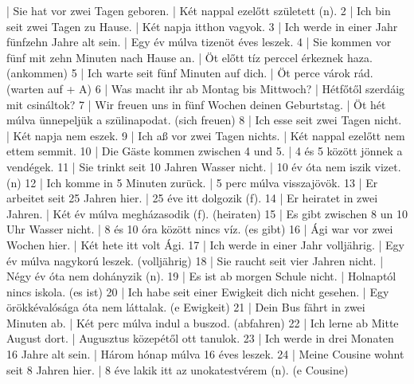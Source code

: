 \documentclass{article}
\newenvironment{exmp}{\verbatim}{\endverbatim}
\begin{document}
\begin{exmp}
1 | Sie hat vor zwei Tagen geboren. | Két nappal ezelőtt született (n).
2 | Ich bin seit zwei Tagen zu Hause. | Két napja itthon vagyok.
3 | Ich werde in einer Jahr fünfzehn Jahre alt sein. | Egy év múlva tizenöt éves leszek.
4 | Sie kommen vor fünf mit zehn Minuten nach Hause an. | Öt előtt tíz perccel érkeznek haza. (ankommen)
5 | Ich warte seit fünf Minuten auf dich. | Öt perce várok rád. (warten auf + A)
6 | Was macht ihr ab Montag bis Mittwoch? | Hétfőtől szerdáig mit csináltok?
7 | Wir freuen uns in fünf Wochen deinen Geburtstag. | Öt hét múlva ünnepeljük a szülinapodat. (sich freuen)
8 | Ich esse seit zwei Tagen nicht. | Két napja nem eszek.
9 | Ich aß vor zwei Tagen nichts. | Két nappal ezelőtt nem ettem semmit.
10 | Die Gäste kommen zwischen 4 und 5. | 4 és 5 között jönnek a vendégek.
11 | Sie trinkt seit 10 Jahren Wasser nicht. | 10 év óta nem iszik vizet. (n)
12 | Ich komme in 5 Minuten zurück. | 5 perc múlva visszajövök.
13 | Er arbeitet seit 25 Jahren hier. | 25 éve itt dolgozik (f).
14 | Er heiratet in zwei Jahren. | Két év múlva megházasodik (f). (heiraten)
15 | Es gibt zwischen 8 un 10 Uhr Wasser nicht. | 8 és 10 óra között nincs víz. (es gibt)
16 | Ági war vor zwei Wochen hier. | Két hete itt volt Ági.
17 | Ich werde in einer Jahr volljährig. | Egy év múlva nagykorú leszek. (volljährig)
18 | Sie raucht seit vier Jahren nicht. | Négy év óta nem dohányzik (n).
19 | Es ist ab morgen Schule nicht. | Holnaptól nincs iskola. (es ist)
20 | Ich habe seit einer Ewigkeit dich nicht gesehen. | Egy örökkévalósága óta nem láttalak. (e Ewigkeit)
21 | Dein Bus fährt in zwei Minuten ab. | Két perc múlva indul a buszod. (abfahren)
22 | Ich lerne ab Mitte August dort. | Augusztus közepétől ott tanulok.
23 | Ich werde in drei Monaten 16 Jahre alt sein. | Három hónap múlva 16 éves leszek.
24 | Meine Cousine wohnt seit 8 Jahren hier. | 8 éve lakik itt az unokatestvérem (n). (e Cousine)
\end{exmp}
\end{document}
